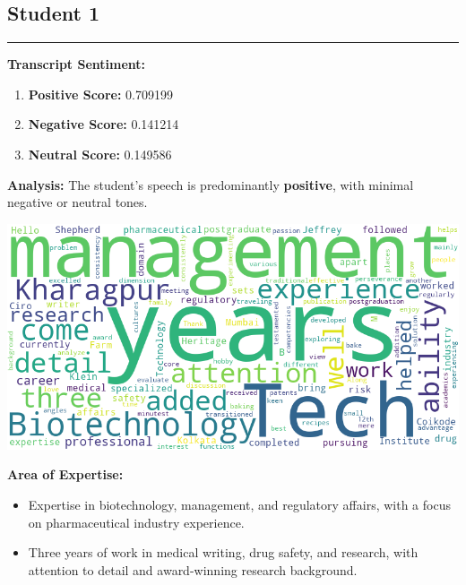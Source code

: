 \documentclass{article}
\begin{document}
\subsection{Student 1}
\begin{center}
    \color{green}\rule{1\linewidth}{0.7mm}
\end{center}
    \large{\textbf{Transcript Sentiment:}}
    \begin{tcolorbox}[ colback=purple!5!white,colframe=purple!75!black,   fonttitle=\bfseries, title=Sentiment Breakdown]
        \begin{enumerate}
            \item \textbf{Positive Score:} \textcolor{green!70!black}{0.709199}
            \item \textbf{Negative Score:} \textcolor{red!70!black}{0.141214}
            \item \textbf{Neutral Score:} \textcolor{blue!70!black}{0.149586}
        \end{enumerate}
    \end{tcolorbox}
    \textbf{Analysis:} The student's speech is predominantly \textbf{positive}, with minimal negative or neutral tones.
    \vspace{0.3in}
    \begin{center}
        \includegraphics[width=1\columnwidth]{images/wordcloud_1.png}
    \end{center}
    \LARGE \textbf{Area of Expertise:} \normalsize
    \begin{itemize} \item Expertise in biotechnology, management, and regulatory affairs, with a focus on pharmaceutical industry experience. \item Three years of work in medical writing, drug safety, and research, with attention to detail and award-winning research background. \end{itemize}
\end{document}
